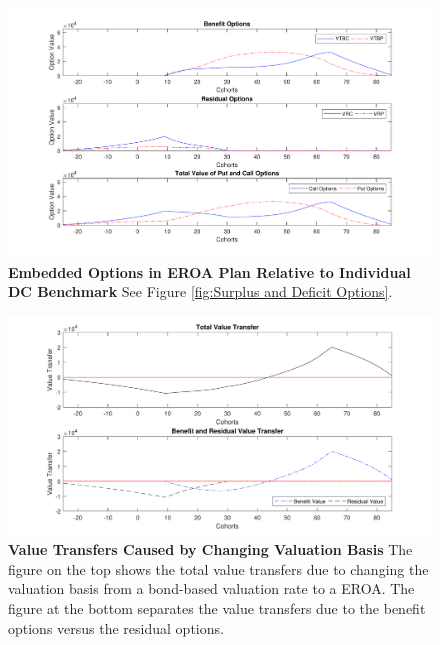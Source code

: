 \documentclass{sfuthesis}
\numberwithin{equation}{chapter}
\begin{document}
	
		\begin{figure}[H]
			\includegraphics[width=1\linewidth]{ResultPlot/SDOptions1.pdf} 
			\caption[Embedded Options in EROA Plan Relative to Individual DC Benchmark]{\textbf{Embedded Options in EROA Plan Relative to Individual DC Benchmark}
			\newline\footnotesize\justify See Figure \ref{fig:Surplus and Deficit Options}.}
			\label{fig:Surplus and Deficit Options in EROA Plan}
		\end{figure}
       \begin{figure}[H]	
			\includegraphics[width=1\linewidth]{ResultPlot/Vtrans1.pdf} 
			\caption[Value Transfers Caused by Changing Valuation Basis]{\textbf{Value Transfers Caused by Changing Valuation Basis}
			\vspace{-0.4cm}
			\newline\footnotesize\justify The figure on the top shows the total value transfers due to changing the valuation basis from a bond-based valuation rate to a EROA. The figure at the bottom separates the value transfers due to the benefit options versus the residual options.}
			\label{fig:Value Transfers Caused by Changing Valuation Rate}
		\end{figure}
	
\end{document}
